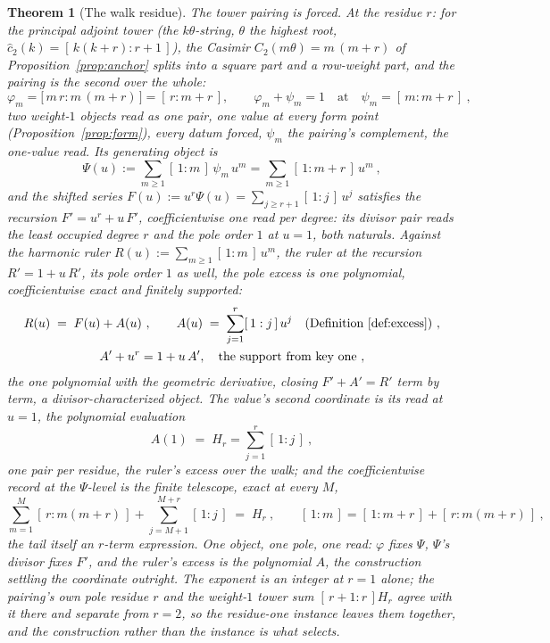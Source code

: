 \documentclass[11pt]{article}
\newtheorem{theorem}{Theorem}
\theoremstyle{definition}
\begin{document}
\begin{theorem}[The walk residue]\label{thm:walkresidue}
The tower pairing is forced. At the residue $r$:
for the principal adjoint tower (the $k\theta$-string, $\theta$ the highest root, $\hat c_2(k)=[\,k(k+r):r+1\,]$), the Casimir $C_2(m\theta)=m\,(m+r)$ of Proposition~\ref{prop:anchor} splits into a square part and a row-weight part,
and the pairing is the second over the whole:
\[
\varphi_m=\big[\,m\,r:m\,(m+r)\,\big]=[\,r:m+r\,],
\qquad
\varphi_m+\psi_m=1\quad\text{at}\quad\psi_m=[\,m:m+r\,]\ ,
\]
two weight-$1$ objects read as one pair, one value at every form
point
(Proposition~\ref{prop:form}), every datum forced, $\psi_m$ the
pairing's complement, the one-value read. Its generating object is
\[
\Psi(u):=\sum_{m\ge1}[\,1:m\,]\,\psi_m\,u^m
=\sum_{m\ge1}[\,1:m+r\,]\,u^m\ ,
\]
and the shifted series $F(u):=u^{r}\Psi(u)=\sum_{j\ge r+1}[\,1:j\,]\,u^j$ satisfies
the recursion
$F'=u^{r}+u\,F'$, coefficientwise one read per degree: its
divisor pair reads the least occupied degree $r$ and the pole order
$1$ at $u{=}1$, both naturals. Against the harmonic ruler
$R(u):=\sum_{m\ge1}[\,1:m\,]\,u^m$, the ruler
at the recursion $R'=1+u\,R'$, its pole order $1$ as well, the pole
excess is
one polynomial, coefficientwise exact and finitely supported:
\begin{gather*}
R(u)\;=\;F(u)+A(u)\ ,\qquad A(u)\;=\;\sum_{j=1}^{r}[\,1:j\,]\,u^j
\quad(\text{Definition~\ref{def:excess}})\ ,\\
A'+u^r=1+u\,A',\quad\text{the support from key one}\ ,
\end{gather*}
the one polynomial with the geometric derivative, closing
$F'+A'=R'$ term by term, a
divisor-characterized object. The value's second coordinate is its
read at $u=1$, the polynomial evaluation
\[
A(1)\;=\;H_r=\sum_{j=1}^{r}[\,1:j\,]\ ,
\]
one pair per residue, the ruler's excess over the walk; and the coefficientwise record at the
$\Psi$-level is the finite telescope, exact at every $M$,
\[
\sum_{m=1}^{M}[\,r:m(m+r)\,]
+\sum_{j=M+1}^{M+r}[\,1:j\,]
\;=\;H_r\ ,
\qquad
[\,1:m\,]=[\,1:m+r\,]+[\,r:m(m+r)\,]\ ,
\]
the tail itself an $r$-term expression. One object, one pole, one
read: $\varphi$ fixes $\Psi$, $\Psi$'s divisor fixes $F'$, and the
ruler's excess is the polynomial $A$, the construction settling the
coordinate outright. The exponent is an integer at $r=1$ alone; the pairing's own
pole residue $r$ and the weight-$1$ tower sum $[\,r+1:r\,]H_r$ agree with it
there and separate from $r=2$, so the residue-one instance leaves them
together, and the construction rather than the instance is what selects.

\end{theorem}
\end{document}
